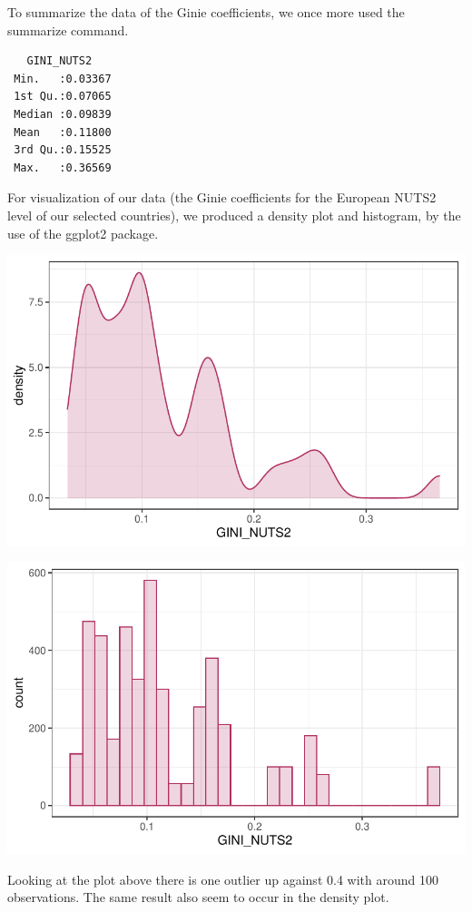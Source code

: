 \documentclass[
  a4paper,
  DIV=11,
  numbers=noendperiod]{scrartcl}
\begin{document}
To summarize the data of the Ginie coefficients, we once more used the
summarize command.

\begin{verbatim}
   GINI_NUTS2     
 Min.   :0.03367  
 1st Qu.:0.07065  
 Median :0.09839  
 Mean   :0.11800  
 3rd Qu.:0.15525  
 Max.   :0.36569  
\end{verbatim}

For visualization of our data (the Ginie coefficients for the European
NUTS2 level of our selected countries), we produced a density plot and
histogram, by the use of the ggplot2 package.

\includegraphics{Eurostat-EDA_files/figure-pdf/unnamed-chunk-8-1.pdf}

\includegraphics{Eurostat-EDA_files/figure-pdf/unnamed-chunk-9-1.pdf}

Looking at the plot above there is one outlier up against 0.4 with
around 100 observations. The same result also seem to occur in the
density plot.
\end{document}
